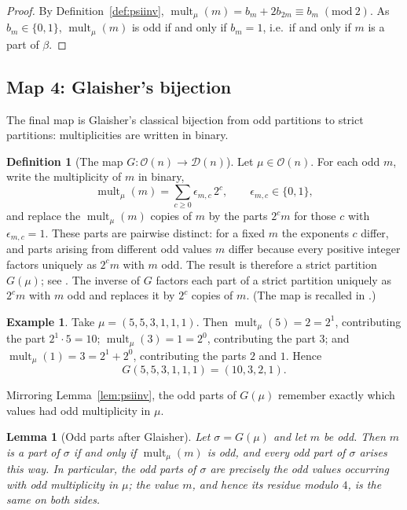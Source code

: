 \documentclass[11pt]{amsart}
\newtheorem{lemma}[theorem]{Lemma}
\theoremstyle{definition}
\newtheorem{definition}[theorem]{Definition}
\newtheorem{example}[theorem]{Example}
\theoremstyle{remark}
\newcommand{\D}{\mathcal D}
\newcommand{\Oparts}{\mathcal O}
\newcommand{\mult}{\operatorname{mult}}
\newcommand{\modulo}[1]{\;(\mathrm{mod}\ #1)}
\begin{document}
\begin{proof}
By Definition~\ref{def:psiinv}, $\mult_\mu(m)=b_m+2b_{2m}\equiv b_m\modulo 2$. As $b_m\in\{0,1\}$, $\mult_\mu(m)$ is odd if and only if $b_m=1$, i.e.\ if and only if $m$ is a part of $\beta$.
\end{proof}

\subsection{Map 4: Glaisher's bijection}\label{sec:map4}
The final map is Glaisher's classical bijection from odd partitions to strict partitions: multiplicities are written in binary.

\begin{definition}[The map \(G:\Oparts(n)\to\D(n)\)]\label{def:G}
Let \(\mu\in\Oparts(n)\). For each odd \(m\), write the multiplicity of \(m\) in
binary,
\[
   \mult_\mu(m)=\sum_{c\ge 0}\epsilon_{m,c}\,2^c,
   \qquad \epsilon_{m,c}\in\{0,1\},
\]
and replace the \(\mult_\mu(m)\) copies of \(m\) by the parts \(2^c m\)
for those \(c\) with \(\epsilon_{m,c}=1\). These parts are pairwise
distinct: for a fixed $m$ the exponents $c$ differ, and parts arising from different odd values $m$ differ because every positive integer factors uniquely as $2^c m$ with $m$ odd. The result is therefore a strict partition \(G(\mu)\); see \cite{Glaisher}. The inverse of $G$ factors each part of a strict partition uniquely as \(2^c m\) with \(m\) odd and replaces it by \(2^c\) copies of
\(m\). (The map is recalled in
\cite[Section 1]{CGJL}.)
\end{definition}

\begin{example}\label{ex:G}
Take $\mu = (5,5,3,1,1,1)$. Then $\mult_\mu(5)=2=2^1$, contributing the part $2^1\cdot 5=10$; $\mult_\mu(3)=1=2^0$, contributing the part $3$; and $\mult_\mu(1)=3=2^1+2^0$, contributing the parts $2$ and $1$. Hence
$$G(5,5,3,1,1,1)=(10,3,2,1).$$
\end{example}

Mirroring Lemma~\ref{lem:psiinv}, the odd parts of $G(\mu)$ remember exactly which values had odd multiplicity in $\mu$.

\begin{lemma}[Odd parts after Glaisher]\label{lem:G}
Let $\sigma = G(\mu)$ and let $m$ be odd. Then $m$ is a part of $\sigma$ if and only if $\mult_\mu(m)$ is odd, and every odd part of $\sigma$ arises this way. In particular, the odd parts of $\sigma$ are precisely the odd values occurring with odd multiplicity in $\mu$; the value $m$, and hence its residue modulo $4$, is the same on both sides.
\end{lemma}
\end{document}
